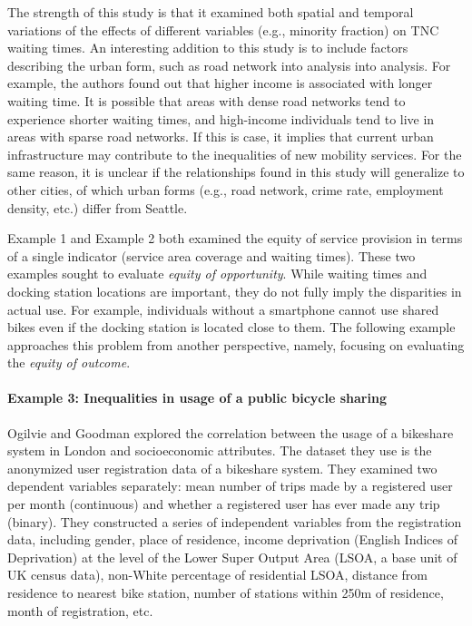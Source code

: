 \documentclass[11pt]{article}
\begin{document}
The strength of this study is that it examined both spatial and temporal variations of the effects of different variables (e.g., minority fraction) on TNC waiting times. An interesting addition to this study is to include factors describing the urban form, such as road network into analysis into analysis. For example, the authors found out that higher income is associated with longer waiting time. It is possible that areas with dense road networks tend to experience shorter waiting times, and high-income individuals tend to live in areas with sparse road networks. If this is case, it implies that current urban infrastructure may contribute to the inequalities of new mobility services. For the same reason, it is unclear if the relationships found in this study will generalize to other cities, of which urban forms (e.g., road network, crime rate, employment density, etc.) differ from Seattle. 

Example 1 and Example 2 both examined the equity of service provision in terms of a single indicator (service area coverage and waiting times). These two examples sought to evaluate \textit{equity of opportunity}. While waiting times and docking station locations are important, they do not fully imply the disparities in actual use. For example, individuals without a smartphone cannot use shared bikes even if the docking station is located close to them. The following example approaches this problem from another perspective, namely, focusing on evaluating the \textit{equity of outcome}.  

\paragraph{Example 3: Inequalities in usage of a public bicycle sharing}
Ogilvie and Goodman \cite{ogilvie2012inequalities} explored the correlation between the usage of a bikeshare system in London and socioeconomic attributes. The dataset they use is the anonymized user registration data of a bikeshare system. They examined two dependent variables separately: mean number of trips made by a registered user per month (continuous) and whether a registered user has ever made any trip (binary). They constructed a series of independent variables from the registration data, including gender, place of residence, income deprivation (English Indices of Deprivation) at the level of the Lower Super Output Area (LSOA, a base unit of UK census data), non-White percentage of residential LSOA, distance from residence to nearest bike station, number of stations within 250m of residence, month of registration, etc. 
\end{document}
